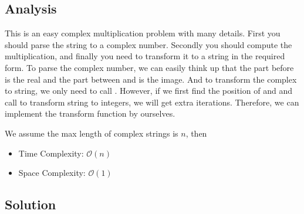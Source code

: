 \subsection*{Analysis}
This is an easy complex multiplication problem with many details. First you should parse the string to a complex number. Secondly you should compute the multiplication, and finally you need to transform it to a string in the required form. To parse the complex number, we can easily think up that the part before \inlinecode{+} is the real and the part between \inlinecode{+} and  is the image. And to transform the complex to string, we only need to call . However, if we first find the position of \inlinecode{+} and  and call  to transform string to integers, we will get extra iterations. Therefore, we can implement the transform function by ourselves.

We assume the max length of complex strings is $n$, then
\begin{itemize}
	\item Time Complexity: $\mathcal{O}(n)$
	\item Space Complexity: $\mathcal{O}(1)$
\end{itemize}

\subsection*{Solution}
